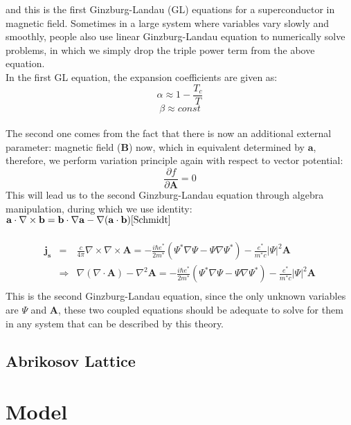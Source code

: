 \documentclass[11pt]{article}
\newcommand{\bqs}{\begin{eqnarray*}}
\newcommand{\eqs}{\end{eqnarray*}}
\newcommand{\Ra}{\Rightarrow}
\newcommand{\pd}{\partial}
\renewcommand{\vec}[1]{\mathbf{#1}}
\begin{document}
and this is the first Ginzburg-Landau (GL) equations for a superconductor in magnetic field. Sometimes in a large system where variables vary slowly and smoothly, people also use linear Ginzburg-Landau equation to numerically solve problems, in which we simply drop the triple power term from the above equation.\\
In the first GL equation, the expansion coefficients are given as:\\
$$
\alpha\approx1-\frac{T_c}{T}
$$
$$
\beta\approx const
$$
\\
The second one comes from the fact that there is now an additional external parameter: magnetic field ($\vec{B}$) now, which in equivalent determined by $\vec{a}$, therefore, we perform variation principle again with respect to vector potential:\\
$$
\frac{\pd f}{\pd \vec{A}}=0
$$
This will lead us to the second Ginzburg-Landau equation through algebra manipulation, during which we use identity: $\vec{a}\cdot\nabla\times\vec{b}=\vec{b}\cdot\nabla\vec{a}-\nabla(\vec{a}\cdot\vec{b})\cite{Schmidt}$\\
\\
\bqs
\vec{j_s}&=&\frac{c}{4\pi}\nabla\times\nabla\times\vec{A}=-\frac{i\hbar e^*}{2m^*}(\Psi^*\nabla\Psi-\Psi\nabla\Psi^*)-\frac{e^*}{m^*c}|\Psi|^2\vec{A}\\
&\Ra& \nabla(\nabla\cdot\vec{A})-\nabla^2\vec{A}=-\frac{i\hbar e^*}{2m^*}(\Psi^*\nabla\Psi-\Psi\nabla\Psi^*)-\frac{e^*}{m^*c}|\Psi|^2\vec{A}\\
\eqs
This is the second Ginzburg-Landau equation, since the only unknown variables are $\Psi$ and $\vec{A}$, these two coupled equations should be adequate to solve for them in any system that can be described by this theory.\\

\subsection{Abrikosov Lattice}
\section{Model}
\end{document}
